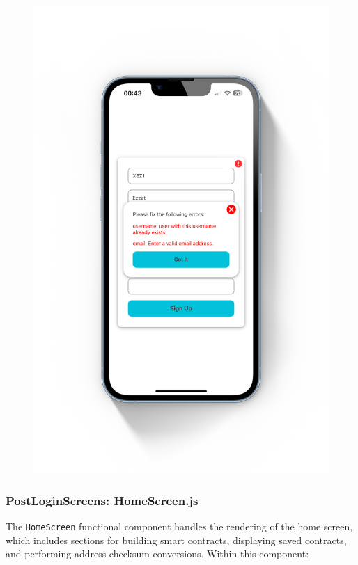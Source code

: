 \begin{figure}[!ht]
\begin{minipage}{0.5\textwidth}
        \includegraphics[scale=0.08]{LATEX/Appendices/Images/Software/Frontend/sign_up_screen_2.png}
        \label{fig:sign up screen 2}
        \end{minipage}
\end{figure}

\subsubsection{PostLoginScreens: HomeScreen.js}

The \texttt{HomeScreen} functional component handles the rendering of the home screen, which includes sections for building smart contracts, displaying saved contracts, and performing address checksum conversions. Within this component:

